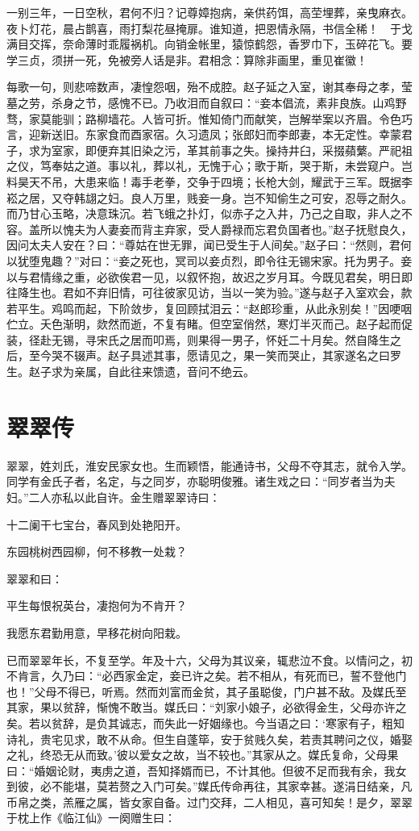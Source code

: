 \documentclass[a4paper,12pt,UTF8,twoside]{ctexbook}
\begin{document}
一别三年，一日空秋，君何不归？记尊嫜抱病，亲供药饵，高茔埋葬，亲曳麻衣。夜卜灯花，晨占鹊喜，雨打梨花昼掩扉。谁知道，把恩情永隔，书信全稀！　于戈满目交挥，奈命薄时乖履祸机。向销金帐里，猿惊鹤怨，香罗巾下，玉碎花飞。要学三贞，须拼一死，免被旁人话是非。君相念：算除非画里，重见崔徽！

每歌一句，则悲啼数声，凄惶怨咽，殆不成腔。赵子延之入室，谢其奉母之孝，莹墓之劳，杀身之节，感愧不已。乃收泪而自叙曰：“妾本倡流，素非良族。山鸡野骛，家莫能驯；路柳墙花。人皆可折。惟知倚门而献笑，岂解举案以齐眉。令色巧言，迎新送旧。东家食而酉家宿。久习遗凤；张郎妇而李郎妻，本无定性。幸蒙君子，求为室家，即便弃其旧染之污，革其前事之失。操持井臼，采掇蘋蘩。严祀祖之仪，笃奉姑之道。事以礼，葬以礼，无愧于心；歌于斯，哭于斯，未尝窥户。岂料昊天不吊，大患来临！毒手老拳，交争于四境；长枪大剑，耀武于三军。既据李崧之居，又夺韩翃之妇。良人万里，贱妾一身。岂不知偷生之可安，忍辱之耐久。而乃甘心玉略，决意珠沉。若飞蛾之扑灯，似赤子之入井，乃己之自取，非人之不容。盖所以愧夫为人妻妾而背主弃家，受人爵禄而忘君负国者也。”赵子抚慰良久，因问太夫人安在？曰：“尊姑在世无罪，闻已受生于人间矣。”赵子曰：“然则，君何以犹堕鬼趣？”对曰：“妾之死也，冥司以妾贞烈，即令往无锡宋家。托为男子。妾以与君情缘之重，必欲俟君一见，以叙怀抱，故迟之岁月耳。今既见君矣，明日即往降生也。君如不弃旧情，可往彼家见访，当以一笑为验。”遂与赵子入室欢会，款若平生。鸡鸣而起，下阶敛步，复回顾拭泪云：“赵郎珍重，从此永别矣！”因哽咽伫立。夭色渐明，欻然而逝，不复有睹。但空室俏然，寒灯半灭而己。赵子起而促装，径赴无锡，寻宋氏之居而叩焉，则果得一男子，怀妊二十月矣。然自降生之后，至今哭不辍声。赵子具述其事，愿请见之，果一笑而哭止，其家遂名之曰罗生。赵子求为亲属，自此往来馈遗，音问不绝云。

\chapter{翠翠传}

翠翠，姓刘氏，淮安民家女也。生而颖悟，能通诗书，父母不夺其志，就令入学。同学有金氏子者，名定，与之同岁，亦聪明俊雅。诸生戏之曰：“同岁者当为夫妇。”二人亦私以此自许。金生赠翠翠诗曰：

十二阑干七宝台，春风到处艳阳开。

东园桃树西园柳，何不移教一处栽？

翠翠和曰：

平生每恨祝英台，凄抱何为不肯开？

我愿东君勤用意，早移花树向阳栽。

已而翠翠年长，不复至学。年及十六，父母为其议亲，辄悲泣不食。以情问之，初不肯言，久乃曰：“必西家金定，妾已许之矣。若不相从，有死而已，誓不登他门也！”父母不得已，听焉。然而刘富而金贫，其子虽聪俊，门户甚不敌。及媒氏至其家，果以贫辞，惭愧不敢当。媒氏曰：“刘家小娘子，必欲得金生，父母亦许之矣。若以贫辞，是负其诚志，而失此一好姻缘也。今当语之曰：‘寒家有子，粗知诗礼，贵宅见求，敢不从命。但生自蓬筚，安于贫贱久矣，若责其聘问之仪，婚娶之礼，终恐无从而致。’彼以爱女之故，当不较也。”其家从之。媒氏复命，父母果曰：“婚姻论财，夷虏之道，吾知择婿而已，不计其他。但彼不足而我有余，我女到彼，必不能堪，莫若赘之入门可矣。”媒氏传命再往，其家幸甚。遂涓日结亲，凡币帛之类，羔雁之属，皆女家自备。过门交拜，二人相见，喜可知矣！是夕，翠翠于枕上作《临江仙》一阕赠生曰：
\end{document}
